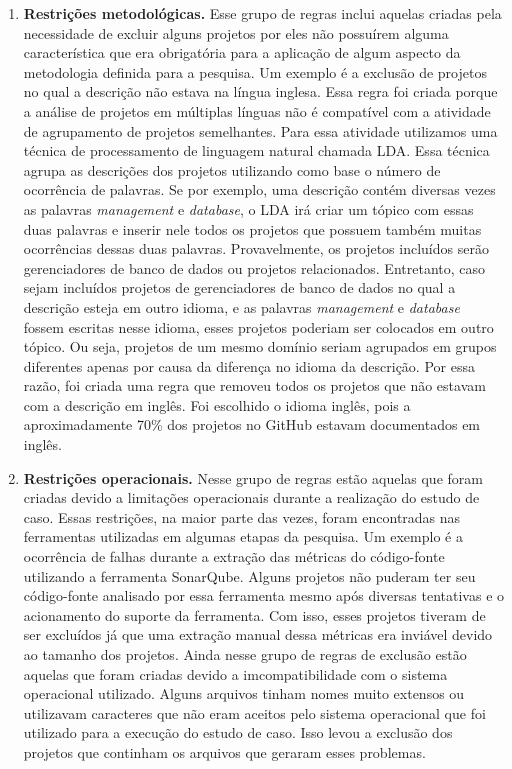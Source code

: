\begin{enumerate}
\item \textbf{Restrições metodológicas.} Esse grupo de regras inclui aquelas criadas pela necessidade de excluir alguns projetos por eles não possuírem alguma característica que era obrigatória para a aplicação de algum aspecto da metodologia definida para a pesquisa. Um exemplo é a exclusão de projetos no qual a descrição não estava na língua inglesa. Essa regra foi criada porque a análise de projetos em múltiplas línguas não é compatível com a atividade de agrupamento de projetos semelhantes. Para essa atividade utilizamos uma técnica de processamento de linguagem natural chamada LDA. Essa técnica agrupa as descrições dos projetos utilizando como base o número de ocorrência de palavras. Se por exemplo, uma descrição contém diversas vezes as palavras \textit{management} e \textit{database}, o LDA irá criar um tópico com essas duas palavras e inserir nele todos os projetos que possuem também muitas ocorrências dessas duas palavras. Provavelmente, os projetos incluídos serão gerenciadores de banco de dados ou projetos relacionados. Entretanto, caso sejam incluídos projetos de gerenciadores de banco de dados no qual a descrição esteja em outro idioma, e as palavras \textit{management} e \textit{database} fossem escritas nesse idioma, esses projetos poderiam ser colocados em outro tópico. Ou seja, projetos de um mesmo domínio seriam agrupados em grupos diferentes apenas por causa da diferença no idioma da descrição. Por essa razão, foi criada uma regra que removeu todos os projetos que não estavam com a descrição em inglês. Foi escolhido o idioma inglês, pois a aproximadamente 70\% dos projetos no GitHub estavam documentados em inglês.
\item \textbf{Restrições operacionais.} Nesse grupo de regras estão aquelas que foram criadas devido a limitações operacionais durante a realização do estudo de caso. Essas restrições, na maior parte das vezes, foram encontradas nas ferramentas utilizadas em algumas etapas da pesquisa. Um exemplo é a ocorrência de falhas durante  a extração das métricas do código-fonte utilizando a ferramenta SonarQube. Alguns projetos não puderam ter seu código-fonte analisado por essa ferramenta mesmo após diversas tentativas e o acionamento do suporte da ferramenta. Com isso, esses projetos tiveram de ser excluídos já que uma extração manual dessa métricas era inviável devido ao tamanho dos projetos. Ainda nesse grupo de regras de exclusão estão aquelas que foram criadas devido a imcompatibilidade com o sistema operacional utilizado. Alguns arquivos tinham nomes muito extensos ou utilizavam caracteres que não eram aceitos pelo sistema operacional que foi utilizado para a execução do estudo de caso. Isso levou a exclusão dos projetos que continham os arquivos que geraram esses problemas.

\end{enumerate}
